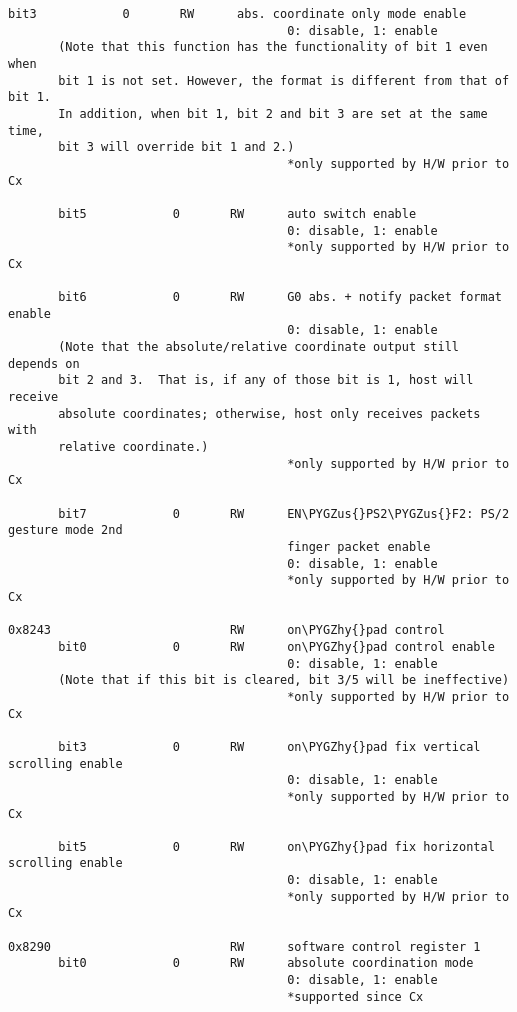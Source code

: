 \documentclass[a4paper,8pt,english]{sphinxmanual}
\def\PYGZus{\char`\_}
\def\PYGZhy{\char`\-}
\begin{document}
\begin{Verbatim}[commandchars=\\\{\}]
       bit3            0       RW      abs. coordinate only mode enable
                                       0: disable, 1: enable
       (Note that this function has the functionality of bit 1 even when
       bit 1 is not set. However, the format is different from that of bit 1.
       In addition, when bit 1, bit 2 and bit 3 are set at the same time,
       bit 3 will override bit 1 and 2.)
                                       *only supported by H/W prior to Cx

       bit5            0       RW      auto switch enable
                                       0: disable, 1: enable
                                       *only supported by H/W prior to Cx

       bit6            0       RW      G0 abs. + notify packet format enable
                                       0: disable, 1: enable
       (Note that the absolute/relative coordinate output still depends on
       bit 2 and 3.  That is, if any of those bit is 1, host will receive
       absolute coordinates; otherwise, host only receives packets with
       relative coordinate.)
                                       *only supported by H/W prior to Cx

       bit7            0       RW      EN\PYGZus{}PS2\PYGZus{}F2: PS/2 gesture mode 2nd
                                       finger packet enable
                                       0: disable, 1: enable
                                       *only supported by H/W prior to Cx

0x8243                         RW      on\PYGZhy{}pad control
       bit0            0       RW      on\PYGZhy{}pad control enable
                                       0: disable, 1: enable
       (Note that if this bit is cleared, bit 3/5 will be ineffective)
                                       *only supported by H/W prior to Cx

       bit3            0       RW      on\PYGZhy{}pad fix vertical scrolling enable
                                       0: disable, 1: enable
                                       *only supported by H/W prior to Cx

       bit5            0       RW      on\PYGZhy{}pad fix horizontal scrolling enable
                                       0: disable, 1: enable
                                       *only supported by H/W prior to Cx

0x8290                         RW      software control register 1
       bit0            0       RW      absolute coordination mode
                                       0: disable, 1: enable
                                       *supported since Cx


\end{Verbatim}
\end{document}
